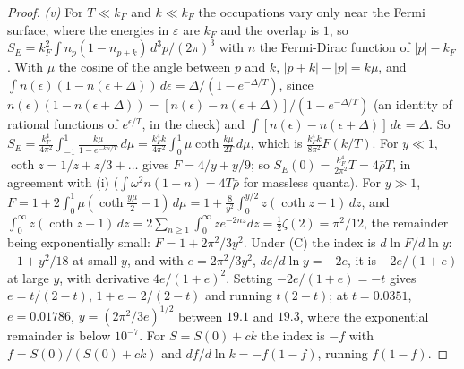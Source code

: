 \begin{proof}
\emph{(v)} For $T \ll k_{F}$ and $k \ll k_{F}$ the occupations vary only near the Fermi surface, where the energies in $\varepsilon$ are $k_{F}$ and the overlap is $1$, so $S_{E} = k_{F}^{2}\int n_{p}(1 - n_{p + k})\,d^{3}p/(2\pi)^{3}$ with $n$ the Fermi-Dirac function of $|p| - k_{F}$. With $\mu$ the cosine of the angle between $p$ and $k$, $|p + k| - |p| = k\mu$, and $\int n(\epsilon)(1 - n(\epsilon + \Delta))\,d\epsilon = \Delta/(1 - e^{-\Delta/T})$, since $n(\epsilon)(1 - n(\epsilon + \Delta)) = [n(\epsilon) - n(\epsilon + \Delta)]/(1 - e^{-\Delta/T})$ (an identity of rational functions of $e^{\epsilon/T}$, in the check) and $\int[n(\epsilon) - n(\epsilon + \Delta)]\,d\epsilon = \Delta$. So $S_{E} = \tfrac{k_{F}^{4}}{4\pi^{2}}\int_{-1}^{1}\tfrac{k\mu}{1 - e^{-k\mu/T}}\,d\mu = \tfrac{k_{F}^{4}k}{4\pi^{2}}\int_{0}^{1}\mu\operatorname{coth}\tfrac{k\mu}{2T}\,d\mu$, which is $\tfrac{k_{F}^{4}k}{8\pi^{2}}F(k/T)$. For $y \ll 1$, $\operatorname{coth} z = 1/z + z/3 + \dots$ gives $F = 4/y + y/9$; so $S_{E}(0) = \tfrac{k_{F}^{4}}{2\pi^{2}}T = 4\bar\rho T$, in agreement with (i) ($\int\omega^{2}n(1 - n) = 4T\bar\rho$ for massless quanta). For $y \gg 1$, $F = 1 + 2\int_{0}^{1}\mu(\operatorname{coth}\tfrac{y\mu}{2} - 1)\,d\mu = 1 + \tfrac{8}{y^{2}}\int_{0}^{y/2}z(\operatorname{coth} z - 1)\,dz$, and $\int_{0}^{\infty}z(\operatorname{coth} z - 1)\,dz = 2\sum_{n \ge 1}\int_{0}^{\infty}ze^{-2nz}dz = \tfrac12\zeta(2) = \pi^{2}/12$, the remainder being exponentially small: $F = 1 + 2\pi^{2}/3y^{2}$. Under (C) the index is $d\ln F/d\ln y$: $-1 + y^{2}/18$ at small $y$, and with $e = 2\pi^{2}/3y^{2}$, $de/d\ln y = -2e$, it is $-2e/(1 + e)$ at large $y$, with derivative $4e/(1 + e)^{2}$. Setting $-2e/(1 + e) = -t$ gives $e = t/(2 - t)$, $1 + e = 2/(2 - t)$ and running $t(2 - t)$; at $t = 0.0351$, $e = 0.01786$, $y = (2\pi^{2}/3e)^{1/2}$ between $19.1$ and $19.3$, where the exponential remainder is below $10^{-7}$. For $S = S(0) + ck$ the index is $-f$ with $f = S(0)/(S(0) + ck)$ and $df/d\ln k = -f(1 - f)$, running $f(1 - f)$.


\end{proof}
